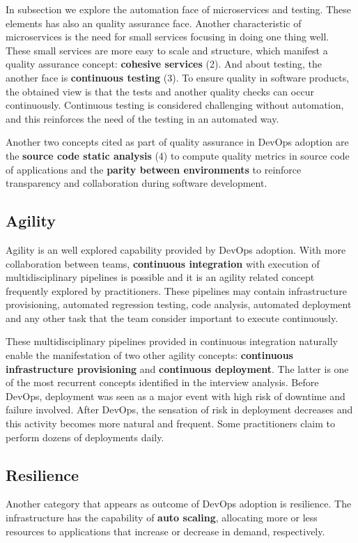 In subsection \label{ssec:automation} we explore the automation face of
microservices and testing. These elements has also an quality assurance face.
Another characteristic of microservices is the need for small services focusing
in doing one thing well. These small services are more easy to scale and
structure, which manifest a quality assurance concept: \textbf{cohesive
services} (2). And about testing, the another face is \textbf{continuous
testing} (3). To ensure quality in software products, the obtained view is that
the tests and another quality checks can occur continuously. Continuous testing
is considered challenging without automation, and this reinforces the need of
the testing in an automated way.

Another two concepts cited as part of quality assurance in DevOps adoption are
the \textbf{source code static analysis} (4) to compute quality metrics in
source code of applications and the \textbf{parity between environments} to
reinforce transparency and collaboration during software development.

\subsection{Agility}

Agility is an well explored capability provided by DevOps adoption. With more
collaboration between teams, \textbf{continuous integration} with execution of
multidisciplinary pipelines is possible and it is an agility related concept
frequently explored by practitioners. These pipelines may contain
infrastructure provisioning, automated regression testing, code analysis,
automated deployment and any other task that the team consider important to
execute continuously.

These multidisciplinary pipelines provided in continuous integration naturally
enable the manifestation of two other agility concepts: \textbf{continuous
infrastructure provisioning} and \textbf{continuous deployment}. The latter is
one of the most recurrent concepts identified in the interview analysis. Before
DevOps, deployment was seen as a major event with high risk of downtime and
failure involved. After DevOps, the sensation of risk in deployment decreases
and this activity becomes more natural and frequent. Some practitioners claim
to perform dozens of deployments daily.

\subsection{Resilience}
Another category that appears as outcome of DevOps adoption is resilience. The
infrastructure has the capability of \textbf{auto scaling}, allocating more or
less resources to applications that increase or decrease in demand,
respectively.

